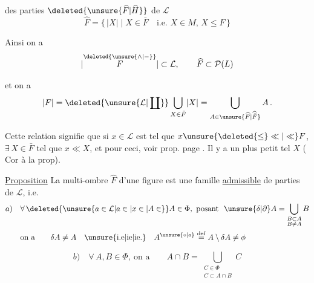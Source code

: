 des parties $\deleted{\unsure{\widehat F|\widehat H}}$ de $\mathcal L$
\[
\widehat F=\bigl\{\,\lvert X\rvert\mid X\in\bar F\quad\text{i.e. }X\in M,\,X\leq F\,\bigr\}
\]

Ainsi on a
\[
\lvert\overset{\deleted{\unsure{\wedge|{-}}}}{F}\rvert\subset\mathcal L,\qquad
\widehat F\subset\mathcal P(L)
\]

et on a
\[
\lvert F\rvert=\deleted{\unsure{\mathcal L|\coprod}}\bigcup_{X\in\bar F}\lvert X\rvert=\bigcup_{A\in\unsure{\widehat F|\widehat{\bar F}}}A\,.
\]

Cette relation signifie que si $x\in\mathcal L$ est tel que $x\unsure{\deleted{\leq}\ll|\ll}F$, $\exists\,X\in\bar F$ tel que $x\ll X$, \unsure{\S|(*)|\&}
et pour ceci, voir prop. page . Il y a  un plus petit tel $X$ (\unsure{=|:} Cor à la prop).

\uline{Proposition} La multi-ombre \inserted{$\Phi=$} $\widehat F$ d'une figure est une famille \uline{admissible} de parties de $\mathcal L$, i.e.
\[
\begin{aligned}
a)\quad &\forall\,\deleted{\unsure{a\in\mathcal L|a\in|x\in|A\in}}A\in\Phi,\ \text{posant }\ \unsure{\delta|\partial}A=\bigcup_{\substack{B\subset A\\B\neq A}}B\\
&\text{on a}\qquad \delta A\neq A\quad\text{\unsure{i.e|ie|ie.}}\quad A^{\unsure{\circ|o}}\overset{\mathrm{def}}{=}A\setminus\delta A\neq\phi
\end{aligned}
\]

\[
b)\quad \forall\,A,B\in\Phi,\ \text{on a}\qquad A\cap B=\bigcup_{\substack{C\in\Phi\\C\subset A\cap B}}C
\]

